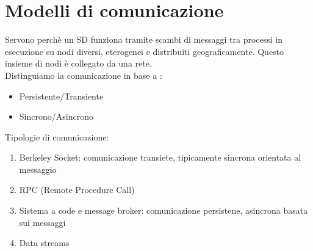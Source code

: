 \documentclass[12pt,italian]{report}
\begin{document}
\chapter{Modelli di comunicazione}
\label{cap:mod comm}
Servono perchè un SD funziona tramite scambi di messaggi tra processi in esecuzione su nodi diversi, eterogenei e distribuiti geograficamente. Questo insieme di nodi è collegato da una rete. \\ Distinguiamo la comunicazione in base a :
\begin{itemize}
    \item Persistente/Transiente
    \item Sincrono/Asincrono
\end{itemize}

Tipologie di comunicazione:
\begin{enumerate}
    \item Berkeley Socket: comunicazione transiete, tipicamente sincrona orientata al messaggio
    \item RPC (Remote Procedure Call)
    \item Sistema a code e message broker: comunicazione persistene, asincrona basata sui messaggi
    \item Data streams
\end{enumerate}
\end{document}
